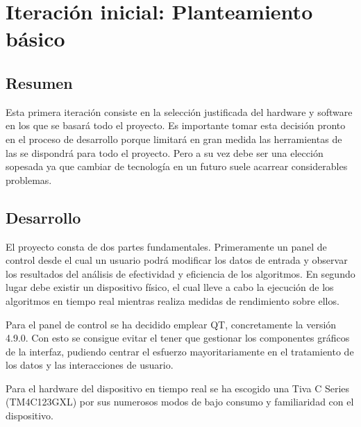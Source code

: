 
\section{Iteración inicial: Planteamiento básico}
        \subsection{Resumen}
        
        Esta primera iteración consiste en la selección justificada del hardware y software en los que se basará todo el proyecto. Es importante tomar esta decisión pronto en el proceso de desarrollo porque limitará en gran medida las herramientas de las se dispondrá para todo el proyecto. Pero a su vez debe ser una elección sopesada ya que cambiar de tecnología en un futuro suele acarrear considerables problemas.
        
        \subsection{Desarrollo}

        El proyecto consta de dos partes fundamentales. Primeramente un panel de control desde el cual un usuario podrá modificar los datos de entrada y observar los resultados del análisis de efectividad y eficiencia de los algoritmos. En segundo lugar debe existir un dispositivo físico, el cual lleve a cabo la ejecución de los algoritmos en tiempo real mientras realiza medidas de rendimiento sobre ellos.

        Para el panel de control se ha decidido emplear QT, concretamente la versión 4.9.0. Con esto se consigue evitar el tener que gestionar los componentes gráficos de la interfaz, pudiendo centrar el esfuerzo mayoritariamente en el tratamiento de los datos y las interacciones de usuario.
        
        Para el hardware del dispositivo en tiempo real se ha escogido una Tiva C Series (TM4C123GXL) por sus numerosos modos de bajo consumo y familiaridad con el dispositivo.        

